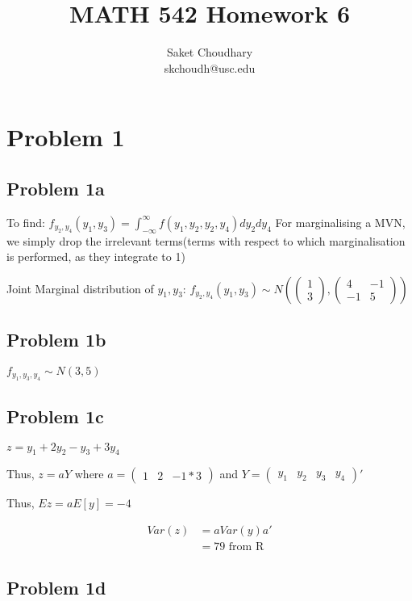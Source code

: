 \documentclass[a4paper]{article}
\title{MATH 542 Homework 6}
\author{Saket Choudhary\\skchoudh@usc.edu}
\begin{document}
\maketitle 
\section*{Problem 1}
\subsection*{Problem 1a}

To find: $f_{y_2,y_4}(y_1,y_3) = \int_{-\infty}^{\infty}f(y_1,y_2,y_2,y_4)dy_2dy_4$
For marginalising a MVN, we simply drop the irrelevant terms(terms with respect to which marginalisation is performed, as they integrate to 1)

Joint Marginal distribution of $y_1,y_3$: $f_{y_2,y_4}(y_1,y_3) \sim N(\begin{pmatrix}1 \\ 3\end{pmatrix},\begin{pmatrix}4 & -1 \\ -1 &5\end{pmatrix})$

\subsection*{Problem 1b}
$f_{y_1,y_3,y_4} \sim N(3, 5)$

\subsection*{Problem 1c}
$z=y_1+2y_2-y_3+3y_4$ 

Thus, $z=aY$ where $a = \begin{pmatrix}1 & 2 & -1 * 3 \end{pmatrix}$ and $Y=\begin{pmatrix}y_1 & y_2 & y_3 & y_4\end{pmatrix}'$

Thus, $Ez = aE[y] = -4$

\begin{align*}
Var(z) &= aVar(y)a'\\
& = 79 \text{ from R}
\end{align*}

\subsection*{Problem 1d}
\end{document}
